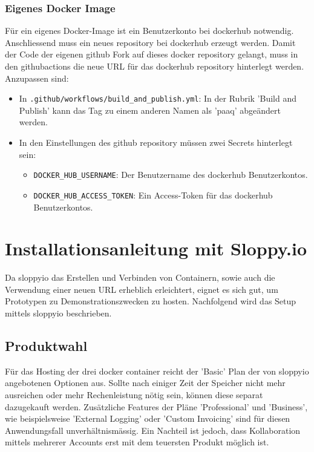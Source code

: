 \documentclass[../main.tex]{subfiles}
\begin{document}
	\subsubsection{Eigenes Docker Image}
	\par Für ein eigenes Docker-Image ist ein Benutzerkonto bei \gls{dockerhub} notwendig. Anschliessend muss ein neues \gls{repository} bei \gls{dockerhub} erzeugt werden. Damit der Code der eigenen \gls{github} Fork auf dieses \gls{docker} \gls{repository} gelangt, muss in den \gls{githubactions} die neue URL für das \gls{dockerhub} \gls{repository} hinterlegt werden. Anzupassen sind:
	\begin{itemize}
		\item In \texttt{.github/workflows/build\_and\_publish.yml}: In der Rubrik 'Build and Publish' kann das Tag zu einem anderen Namen als 'paaq' abgeändert werden.
		\item In den Einstellungen des \gls{github} \gls{repository} müssen zwei Secrets hinterlegt sein:
		\begin{itemize}
			\item \texttt{DOCKER\_HUB\_USERNAME}: Der Benutzername des \gls{dockerhub} Benutzerkontos.
			\item \texttt{DOCKER\_HUB\_ACCESS\_TOKEN}: Ein Access-Token für das \gls{dockerhub} Benutzerkontos.
		\end{itemize}
	\end{itemize}
	
	
	\section{Installationsanleitung mit Sloppy.io}
	Da \gls{sloppyio} das Erstellen und Verbinden von Containern, sowie auch die Verwendung einer neuen URL erheblich erleichtert, eignet es sich gut, um Prototypen zu Demonstrationszwecken zu hosten. Nachfolgend wird das Setup mittels \gls{sloppyio} beschrieben.
	
	\subsection{Produktwahl}
	Für das Hosting der drei \gls{docker} \gls{container} reicht der 'Basic' Plan der von \gls{sloppyio} angebotenen Optionen aus. Sollte nach einiger Zeit der Speicher nicht mehr ausreichen oder mehr Rechenleistung nötig sein, können diese separat dazugekauft werden. Zusätzliche Features der Pläne 'Professional' und 'Business', wie beispielsweise 'External Logging' oder 'Custom Invoicing' sind für diesen Anwendungsfall unverhältnismässig. Ein Nachteil ist jedoch, dass Kollaboration mittels mehrerer Accounts erst mit dem teuersten Produkt möglich ist.
	
\end{document}
